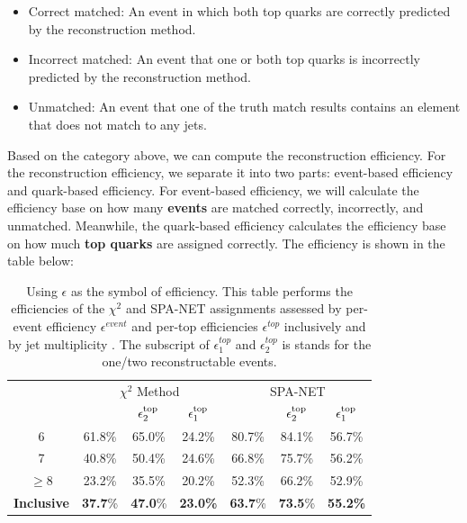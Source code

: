 \begin{itemize}
	\item Correct matched: An event in which both top quarks are correctly predicted by the reconstruction method.
	\item Incorrect matched: An event that one or both top quarks is incorrectly predicted by the reconstruction method.
	\item Unmatched: An event that one of the truth match results contains an element that does not match to any jets.
\end{itemize}
Based on the category above, we can compute the reconstruction efficiency. For the reconstruction efficiency, we separate it into two parts: event-based efficiency and quark-based efficiency. For event-based efficiency, we will calculate the efficiency base on how many \textbf{events} are matched correctly, incorrectly, and unmatched. Meanwhile, the quark-based efficiency calculates the efficiency base on how much \textbf{top quarks} are assigned correctly. The efficiency is shown in the table below:
\\
\begin{table}[H]
	\caption{Using $\epsilon$ as the symbol of efficiency. This table performs the efficiencies of the $\chi^2$ and SPA-NET assignments assessed by per-event efficiency $\epsilon^{event}$ and per-top efficiencies $\epsilon^{top}$ inclusively and by jet multiplicity \Njets. The subscript of $\epsilon^{top}_{1}$ and $\epsilon^{top}_{2}$ is stands for the one/two reconstructable events.}
	\centering
	\begin{tabular}{c c  c  c  c c  c}
		\hline
		\hline
		& \multicolumn{3}{c}{$\chi^2$ Method} & \multicolumn{3}{c}{SPA-NET }\\
		\hspace{0.2cm}\Njets & \hspace{0.15cm} \epsevent & $\epsilon^\mathrm{top}_2$ & \hspace{0.15cm} $\epsilon^\mathrm{top}_1$ \hspace{0.15cm} & \hspace{0.15cm} \epsevent & $\epsilon^\mathrm{top}_2$ & \hspace{0.15cm} $\epsilon^\mathrm{top}_1$ \hspace{0.15cm}   \\
		\midrule
		6          & 61.8\% & 65.0\% & 24.2\% & 80.7\% & 84.1\% & 56.7\% \\
		7          & 40.8\% & 50.4\% & 24.6\% & 66.8\% & 75.7\% & 56.2\% \\
		$\geq$8    & 23.2\% & 35.5\% & 20.2\% & 52.3\% & 66.2\% & 52.9\% \\
		\midrule     
		\vspace{0.2cm}
		\textbf{Inclusive}  &\textbf{ 37.7}\% & \textbf{47.0}\% & \textbf{23.0\%} & \textbf{63.7}\% &\textbf{73.5}\% &\textbf{55.2\%} \\
		\hline
	\end{tabular}
	\label{tab:eps}
\end{table}
